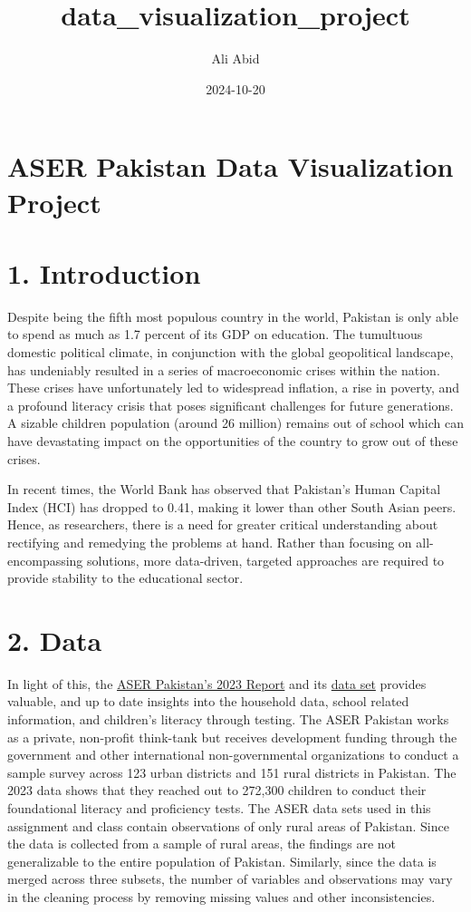 \documentclass[
]{article}
\title{data\_visualization\_project}
\author{Ali Abid}
\date{2024-10-20}
\begin{document}
\maketitle

\section{ASER Pakistan Data Visualization
Project}\label{aser-pakistan-data-visualization-project}

\section{1. Introduction}\label{introduction}

Despite being the fifth most populous country in the world, Pakistan is
only able to spend as much as 1.7 percent of its GDP on education. The
tumultuous domestic political climate, in conjunction with the global
geopolitical landscape, has undeniably resulted in a series of
macroeconomic crises within the nation. These crises have unfortunately
led to widespread inflation, a rise in poverty, and a profound literacy
crisis that poses significant challenges for future generations. A
sizable children population (around 26 million) remains out of school
which can have devastating impact on the opportunities of the country to
grow out of these crises.

In recent times, the World Bank has observed that Pakistan's Human
Capital Index (HCI) has dropped to 0.41, making it lower than other
South Asian peers. Hence, as researchers, there is a need for greater
critical understanding about rectifying and remedying the problems at
hand. Rather than focusing on all-encompassing solutions, more
data-driven, targeted approaches are required to provide stability to
the educational sector.

\section{2. Data}\label{data}

In light of this, the \href{https://aserpakistan.org/report}{ASER
Pakistan's 2023 Report} and its
\href{https://aserpakistan.org/index.php?func=data_statistics}{data set}
provides valuable, and up to date insights into the household data,
school related information, and children's literacy through testing. The
ASER Pakistan works as a private, non-profit think-tank but receives
development funding through the government and other international
non-governmental organizations to conduct a sample survey across 123
urban districts and 151 rural districts in Pakistan. The 2023 data shows
that they reached out to 272,300 children to conduct their foundational
literacy and proficiency tests. The ASER data sets used in this
assignment and class contain observations of only rural areas of
Pakistan. Since the data is collected from a sample of rural areas, the
findings are not generalizable to the entire population of Pakistan.
Similarly, since the data is merged across three subsets, the number of
variables and observations may vary in the cleaning process by removing
missing values and other inconsistencies.
\end{document}
